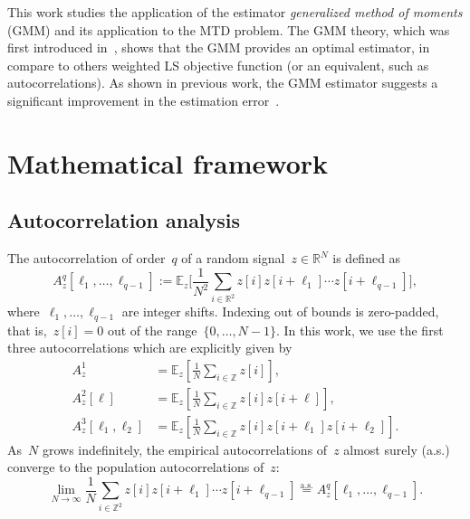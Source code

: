 \documentclass{article}
\begin{document}
This work studies the application of the estimator \textit{generalized method of moments} (GMM) and its application to the MTD problem. The GMM theory, which was first introduced in~\cite{Hansen1982},  shows that the GMM provides {an} optimal estimator, in compare to others weighted LS objective function (or an equivalent, such as autocorrelations). As shown in previous work, the GMM estimator suggests a significant improvement in the estimation error~\cite{abas2021generalized}.

\section{Mathematical framework}
\label{sec:math}
\subsection{Autocorrelation analysis}
\label{subsec:ac}
The autocorrelation of order~$q$ of a random signal~\mbox{$z \in \mathbb{R}^{N}$} is defined as
\begin{equation}
A_z^q[\ell_1, \ldots, \ell_{q-1}] := \mathbb{E}_z\Big[\frac{1}{N^2} \sum_{i \in \mathbb{R}^2} z[i] z[i + \ell_1] \cdots z[i + \ell_{q-1}]\Big],
\end{equation}
where~$\ell_1, \ldots, \ell_{q-1}$ are integer shifts. Indexing out of bounds is zero-padded, that is,~\mbox{$z[i] = 0$} out of the range~\mbox{$\{0, \ldots, {N-1}\}$}. In this work, we use the first three autocorrelations which are explicitly given by
\begin{align}
\label{eq:ac1}
A_z^1 &= \mathbb{E}_z \left[\frac{1}{N} \sum_{i \in \mathbb{Z}} z\left[i\right] \right], \\
\label{eq:ac2}
A_z^2\left[\ell\right] &= \mathbb{E}_z \left[\frac{1}{N} \sum_{i \in \mathbb{Z}} z\left[i\right] z\left[i + \ell\right] \right], \\
\label{eq:ac3}
A_z^3\left[\ell_1, \ell_2\right] &= \mathbb{E}_z \left[\frac{1}{N} \sum_{i \in \mathbb{Z}} z\left[i\right] z\left[i + \ell_1\right] z\left[i + \ell_2\right] \right].
\end{align}
As~$N$ grows indefinitely, the empirical autocorrelations of~$z$ almost surely (a.s.) converge to the population autocorrelations of~$z$:
\begin{equation}
\lim_{N \rightarrow \infty} \frac{1}{N} \sum_{i \in \mathbb{Z}^2} z[i] z[i + \ell_1] \cdots z[i + \ell_{q-1}] \stackrel{\text{a.s.}}{=}A_z^q[\ell_1, \ldots, \ell_{q-1}].
\end{equation}
\end{document}
